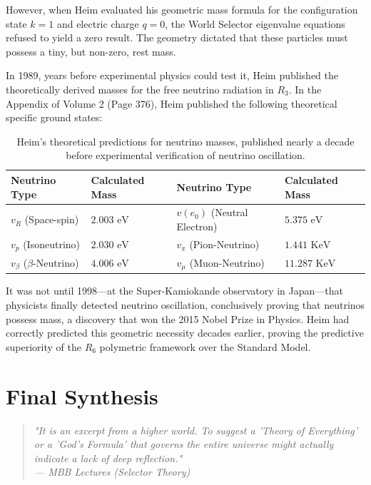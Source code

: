 \documentclass[11pt,a4paper,oneside]{article}
\newenvironment{fancyquote}
    {\begin{quote}\itshape\color{theoryblue!80!black}\guillemotleft\;}
    {\;\guillemotright\end{quote}}
\begin{document}
However, when Heim evaluated his geometric mass formula for the configuration state $k=1$ and electric charge $q=0$, the World Selector eigenvalue equations refused to yield a zero result. The geometry dictated that these particles must possess a tiny, but non-zero, rest mass.

In 1989, years before experimental physics could test it, Heim published the theoretically derived masses for the free neutrino radiation in $R_3$. In the Appendix of Volume 2 (Page 376), Heim published the following theoretical specific ground states:

\begin{table}[htbp]
\centering
\renewcommand{\arraystretch}{1.3}
\begin{tabular}{ll | ll}
\toprule
\textbf{Neutrino Type} & \textbf{Calculated Mass} & \textbf{Neutrino Type} & \textbf{Calculated Mass} \\
\midrule
\rowcolor{theorygray!20}
$v_R$ (Space-spin)  & $2.003 \text{ eV}$ & $v(e_0)$ (Neutral Electron) & $5.375 \text{ eV}$ \\
$v_p$ (Isoneutrino) & $2.030 \text{ eV}$ & $v_\pi$ (Pion-Neutrino) & $1.441 \text{ KeV}$ \\
\rowcolor{theorygray!20}
$v_\beta$ ($\beta$-Neutrino) & $4.006 \text{ eV}$ & $v_\mu$ (Muon-Neutrino) & $11.287 \text{ KeV}$ \\
\bottomrule
\end{tabular}
\caption{Heim's theoretical predictions for neutrino masses, published nearly a decade before experimental verification of neutrino oscillation.}
\end{table}

It was not until 1998—at the Super-Kamiokande observatory in Japan—that physicists finally detected neutrino oscillation, conclusively proving that neutrinos possess mass, a discovery that won the 2015 Nobel Prize in Physics. Heim had correctly predicted this geometric necessity decades earlier, proving the predictive superiority of the $R_6$ polymetric framework over the Standard Model.

\section{Final Synthesis}

\begin{fancyquote}
    "It is an excerpt from a higher world. To suggest a 'Theory of Everything' or a 'God's Formula' that governs the entire universe might actually indicate a lack of deep reflection." \\
    --- \textit{MBB Lectures (Selector Theory)}
\end{fancyquote}
\end{document}
